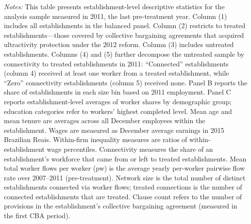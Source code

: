 \begin{table}[H]
\begin{threeparttable}
\begin{tablenotes}
    \item \textit{Notes:} This table presents establishment-level descriptive statistics for the analysis sample measured in 2011, the last pre-treatment year. Column (1) includes all establishments in the balanced panel. Column (2) restricts to treated establishments---those covered by collective bargaining agreements that acquired ultractivity protection under the 2012 reform. Column (3) includes untreated establishments. Columns (4) and (5) further decompose the untreated sample by connectivity to treated establishments in 2011: ``Connected'' establishments (column 4) received at least one worker from a treated establishment, while ``Zero'' connectivity establishments (column 5) received none. Panel B reports the share of establishments in each size bin based on 2011 employment. Panel C reports establishment-level averages of worker shares by demographic group; education categories refer to workers' highest completed level. Mean age and mean tenure are averages across all December employees within the establishment. Wages are measured as December average earnings in 2015 Brazilian Reais. Within-firm inequality measures are ratios of within-establishment wage percentiles. Connectivity measures the share of an establishment's workforce that came from or left to treated establishments. Mean total worker flows per worker (pw) is the average yearly per-worker pairwise flow rate over 2007--2011 (pre-treatment). Network size is the total number of distinct establishments connected via worker flows; treated connections is the number of connected establishments that are treated. Clause count refers to the number of provisions in the establishment's collective bargaining agreement (measured in the first CBA period).
\end{tablenotes}
\end{threeparttable}
\end{table}